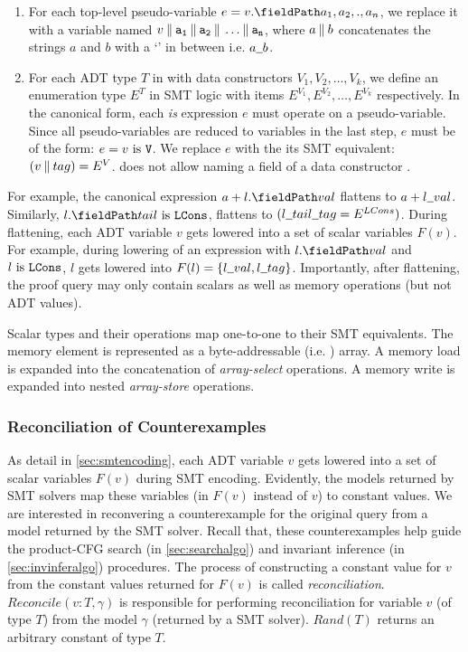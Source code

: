 \begin{enumerate}
\item For each top-level pseudo-variable $e = \prodAccess{v}{a_1,a_2,.,a_n}$, we replace it with a
variable named $v \mathbin\Vert{} {\tt a_1} \mathbin\Vert{} {\tt a_2} \mathbin\Vert{} \dots \mathbin\Vert{} {\tt a_n}$,
where $a \mathbin\Vert{} b$ concatenates the strings $a$ and $b$ with a `\strsep{}' in between i.e. $a \strsep{} b$.

\item For each ADT type $T$ in \SpecL{} with data constructors $V_1,V_2,\dots,V_k$,
we define an enumeration type $E^T$ in SMT logic with items $E^{V_1},E^{V_2},\dots,E^{V_k}$ respectively.
In the canonical form, each {\em is} expression $e$ must operate on a pseudo-variable.
Since all pseudo-variables are reduced to variables in the last step, $e$ must be of the form: $e = v\ \mathrm{is}\ {\tt V}$.
We replace $e$ with the its SMT equivalent: $(v \mathbin\Vert{} tag) = E^V$.
\SpecL{} does not allow naming a field of a data constructor .
\end{enumerate}

\noindent For example, the canonical expression $a + \prodAccess{l}{val}$ flattens to $a + l \strsep{} val$.
Similarly, $\sumIs{\prodAccess{l}{tail}}{LCons}$, flattens to $(l \strsep{} tail \strsep{} tag = E^{LCons})$.
During flattening, each ADT variable $v$ gets lowered into a set of scalar variables $F(v)$.
For example, during lowering of an expression with $\prodAccess{l}{val}$ and $l\ \mathrm{is}\ {\tt LCons}$,
$l$ gets lowered into $F(l) = \{ l \strsep{} val, l \strsep{} tag \}$.
Importantly, after flattening, the proof query may only contain scalars as well as memory operations
(but not ADT values).

Scalar types and their operations map one-to-one to their SMT equivalents.
The memory element \mem{} is represented as a byte-addressable (i.e. ) array.
A memory load  is expanded into the concatenation of  {\em array-select} operations.
A memory write  is expanded into  nested {\em array-store} operations.

\subsubsection{Reconciliation of Counterexamples}
\label{sec:cerecons}
As detail in \cref{sec:smtencoding}, each ADT variable $v$ gets lowered into a set of scalar
variables $F(v)$ during SMT encoding.
Evidently, the models returned by SMT solvers map these variables (in $F(v)$ instead of $v$)
to constant values.
We are interested in reconvering a counterexample for the original query from a
model returned by the SMT solver.
Recall that, these counterexamples help guide the product-CFG search (in \cref{sec:searchalgo})
and invariant inference (in \cref{sec:invinferalgo}) procedures.
The process of constructing a constant value for $v$ from the constant values returned for $F(v)$
is called {\em reconciliation}.
$Reconcile(v:T, \gamma)$ is responsible for performing reconciliation for variable $v$ (of type $T$)
from the model $\gamma$ (returned by a SMT solver).
$Rand(T)$ returns an arbitrary constant of type $T$.


